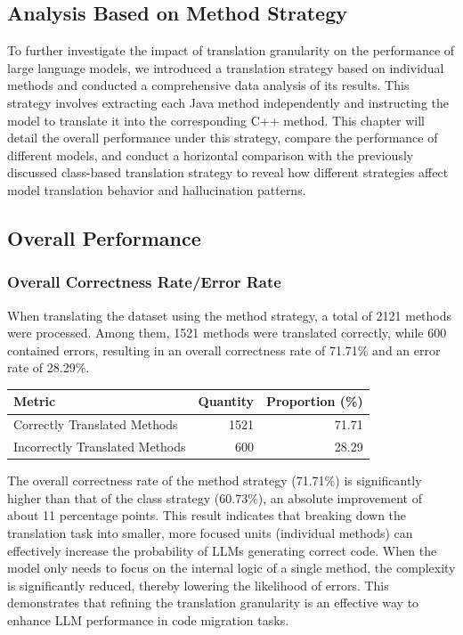 \subsection{Analysis Based on Method Strategy}
To further investigate the impact of translation granularity on the performance of large language models, we introduced a translation strategy based on individual methods and conducted a comprehensive data analysis of its results. This strategy involves extracting each Java method independently and instructing the model to translate it into the corresponding C++ method. This chapter will detail the overall performance under this strategy, compare the performance of different models, and conduct a horizontal comparison with the previously discussed class-based translation strategy to reveal how different strategies affect model translation behavior and hallucination patterns.

\subsection{Overall Performance}
\subsubsection{Overall Correctness Rate/Error Rate}
When translating the dataset using the method strategy, a total of 2121 methods were processed. Among them, 1521 methods were translated correctly, while 600 contained errors, resulting in an overall correctness rate of 71.71\% and an error rate of 28.29\%.

\begin{table}[H]
  \centering
  \label{tab:translation-stats}
  \begin{tabular}{lrr}
    \hline
    Metric                         & Quantity & Proportion (\%) \\
    \hline
    Correctly Translated Methods   & 1521     & 71.71           \\
    Incorrectly Translated Methods & 600     & 28.29           \\
    \hline
  \end{tabular}
\end{table}

The overall correctness rate of the method strategy (71.71\%) is significantly higher than that of the class strategy (60.73\%), an absolute improvement of about 11 percentage points. This result indicates that breaking down the translation task into smaller, more focused units (individual methods) can effectively increase the probability of LLMs generating correct code. When the model only needs to focus on the internal logic of a single method, the complexity is significantly reduced, thereby lowering the likelihood of errors. This demonstrates that refining the translation granularity is an effective way to enhance LLM performance in code migration tasks.

